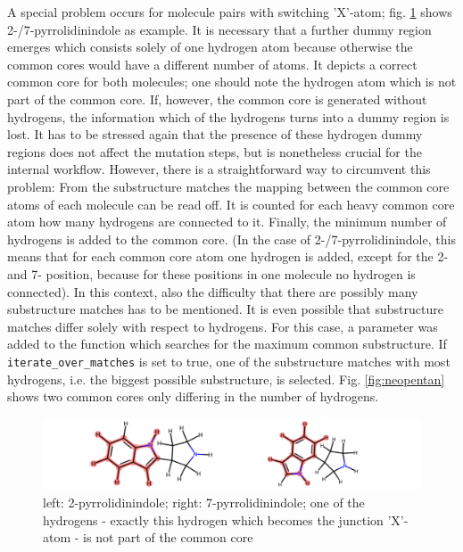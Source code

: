 A special problem occurs for molecule pairs with switching 'X'-atom; fig. \ref{fig:pyrrolidinindole} shows 2-/7-pyrrolidinindole as example. It is necessary that a further dummy region emerges which consists solely of one hydrogen atom because otherwise the common cores would have a different number of atoms. It depicts a correct common core for both molecules; one should note the hydrogen atom which is not part of the common core. If, however, the common core is generated without hydrogens, the information which of the hydrogens turns into a dummy region is lost.
It has to be stressed again that the presence of these hydrogen dummy regions does not affect the mutation steps, but is nonetheless crucial for the internal {\trafo} workflow. However, there is a straightforward way to circumvent this problem: From the substructure matches the mapping between the common core atoms of each molecule can be read off. It is counted for each heavy common core atom how many hydrogens are connected to it. Finally, the minimum number of hydrogens is added to the common core. (In the case of 2-/7-pyrrolidinindole, this means that for each common core atom one hydrogen is added, except for the 2- and 7- position, because for these positions in one molecule no hydrogen is connected).
In this context, also the difficulty that there are possibly many substructure matches has to be mentioned.
It is even possible that substructure matches differ solely with respect to hydrogens. For this case, a parameter was added to the function which searches for the maximum common substructure. If \texttt{iterate\_over\_matches} is set to true, one of the substructure matches with most hydrogens, i.e. the biggest possible substructure, is selected. Fig. \ref{fig:neopentan} shows two common cores only differing in the number of hydrogens.



\begin{figure}
	\includegraphics[scale=0.8]{pyrrolidinindole}
	
	\caption{
		left: 2-pyrrolidinindole; right: 7-pyrrolidinindole; 
		one of the hydrogens - exactly this hydrogen which becomes the junction 'X'-atom - is not part of the common core}
	\label{fig:pyrrolidinindole}
\end{figure}


